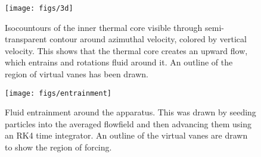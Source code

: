 \begin{figure}[htb]
\centering
\begin{minipage}{0.45\textwidth}
\centering
 \texttt{[image: figs/3d]}
 \caption{Isocountours of the inner thermal core
  visible through semi-transparent contour around azimuthal velocity,
  colored by vertical velocity. This shows that the thermal core creates
 an upward flow, which entrains and rotations fluid around it. An
 outline of the region of virtual vanes has been drawn.}
 \label{fig:thermal}  
\end{minipage}\hfill
\begin{minipage}{0.45\textwidth}
\centering
\texttt{[image: figs/entrainment]}
\caption{Fluid entrainment around the apparatus. This was drawn by
 seeding particles into the averaged flowfield and then advancing them
 using an RK4 time integrator. An outline of the
  virtual vanes are drawn to show the region of forcing.}
 \label{fig:entrain}  
\end{minipage}
\end{figure}




